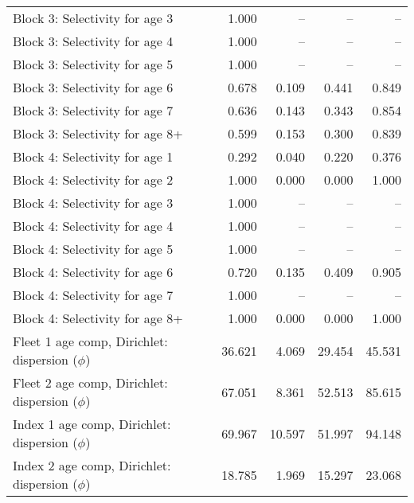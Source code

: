 \documentclass[
]{article}
\begin{document}
\begin{landscape}
\begin{longtable}[t]{lrrrr}
\addlinespace
Block 3: Selectivity for age 3 & 1.000 & -- & -- & --\\
Block 3: Selectivity for age 4 & 1.000 & -- & -- & --\\
Block 3: Selectivity for age 5 & 1.000 & -- & -- & --\\
Block 3: Selectivity for age 6 & 0.678 & 0.109 & 0.441 & 0.849\\
Block 3: Selectivity for age 7 & 0.636 & 0.143 & 0.343 & 0.854\\
\addlinespace
Block 3: Selectivity for age 8+ & 0.599 & 0.153 & 0.300 & 0.839\\
Block 4: Selectivity for age 1 & 0.292 & 0.040 & 0.220 & 0.376\\
Block 4: Selectivity for age 2 & 1.000 & 0.000 & 0.000 & 1.000\\
Block 4: Selectivity for age 3 & 1.000 & -- & -- & --\\
Block 4: Selectivity for age 4 & 1.000 & -- & -- & --\\
\addlinespace
Block 4: Selectivity for age 5 & 1.000 & -- & -- & --\\
Block 4: Selectivity for age 6 & 0.720 & 0.135 & 0.409 & 0.905\\
Block 4: Selectivity for age 7 & 1.000 & -- & -- & --\\
Block 4: Selectivity for age 8+ & 1.000 & 0.000 & 0.000 & 1.000\\
Fleet 1 age comp, Dirichlet: dispersion ($\phi$) & 36.621 & 4.069 & 29.454 & 45.531\\
\addlinespace
Fleet 2 age comp, Dirichlet: dispersion ($\phi$) & 67.051 & 8.361 & 52.513 & 85.615\\
Index 1 age comp, Dirichlet: dispersion ($\phi$) & 69.967 & 10.597 & 51.997 & 94.148\\
Index 2 age comp, Dirichlet: dispersion ($\phi$) & 18.785 & 1.969 & 15.297 & 23.068\\*
\end{longtable}
\end{landscape}
\end{document}
